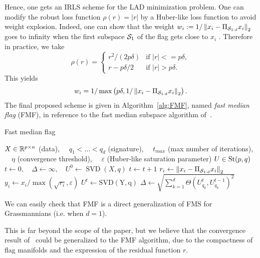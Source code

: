 Hence, one gets an IRLS scheme for the LAD minimization problem. 
One can modify the robust loss function $\rho(r) = |r|$ by a Huber-like loss function to avoid weight explosion. Indeed, one can show that the weight $w_i := 1 / \norm{x_i - \Pi_{\Sf} x_i}_2$ goes to infinity when the first subspace $\S_1$ of the flag gets close to $x_i$ .
Therefore in practice, we take 
\begin{equation}
    \rho(r) = 
        \begin{cases}
            r^2 / (2 p \delta) & \text{if } |r| <= p\delta,\\
            r - p \delta / 2 & \text{if } |r| > p\delta.
        \end{cases}
\end{equation}
This yields
\begin{equation}
    w_i = 1 / \max\lrp{p\delta,  1 / \norm{x_i - \Pi_{\Sf} x_i}_2}.
\end{equation}
The final proposed scheme is given in Algorithm~\ref{alg:FMF}, named \textit{fast median flag} (FMF), in reference to the fast median subspace algorithm of~\citet{lerman_fast_2018}.
\begin{algorithm}
\caption{Fast median flag}\label{alg:FMF}
\begin{algorithmic}
\Require $X\in \R^{p\times n}$ (data), $\quad q_1 < \dots < q_d$ (signature), $\quad t_{max}$ (max number of iterations), $\quad \eta$ (convergence threshold), $\quad \varepsilon$ (Huber-like saturation parameter)
\Ensure
$U \in \St(p, q)$
\State $t \gets 0, \quad \Delta \gets \infty, \quad U^0 \gets \operatorname{SVD}(X, q)$
    \State $t \gets t+1$
    \State $r_i \gets \norm{x_i - \Pi_{\Sf} x_i}_2$
    \State $y_i \gets {x_i} / {\max(\sqrt{r_i}, \varepsilon)}$
    \State $U^t \gets \operatorname{SVD(Y, q)}$
    \State $\Delta \gets \sqrt{\sum_{k=1}^{d} \Theta(U^t_{q_k}, U^{t-1}_{q_k})^2}$
\EndWhile
\end{algorithmic}
\end{algorithm}
We can easily check that FMF is a direct generalization of FMS for Grassmannians (i.e. when $d=1$).


\begin{remark}
This is far beyond the scope of the paper, but we believe that the convergence result of~\citet[Theorem~1]{peng_convergence_2023} could be generalized to the FMF algorithm, due to the compactness of flag manifolds and the expression of the residual function $r$.
\end{remark}

